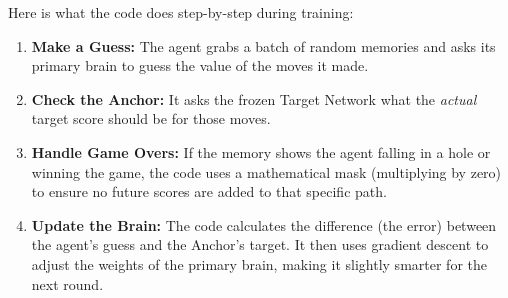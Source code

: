 \documentclass[12pt]{article}
\begin{document}
Here is what the code does step-by-step during training:
\begin{enumerate}
    \item \textbf{Make a Guess:} The agent grabs a batch of random memories and asks its primary brain to guess the value of the moves it made.
    \item \textbf{Check the Anchor:} It asks the frozen Target Network what the \textit{actual} target score should be for those moves.
    \item \textbf{Handle Game Overs:} If the memory shows the agent falling in a hole or winning the game, the code uses a mathematical mask (multiplying by zero) to ensure no future scores are added to that specific path.
    \item \textbf{Update the Brain:} The code calculates the difference (the error) between the agent's guess and the Anchor's target. It then uses gradient descent to adjust the weights of the primary brain, making it slightly smarter for the next round.
\end{enumerate}
\end{document}
